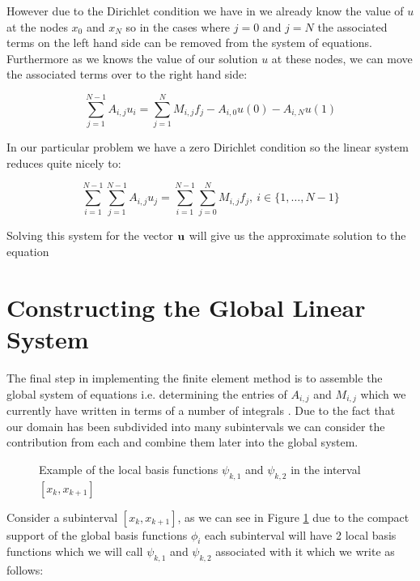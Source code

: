 However due to the Dirichlet condition we have in 
we already know the value of $u$ at the nodes $x_0$ and $x_N$ so in the cases
where $j = 0$ and $j = N$ the associated terms on the left hand side can be
removed from the system of equations. Furthermore as we knows the value of our
solution $u$ at these nodes, we can move the associated terms over to the right
hand side:

\begin{equation}
    \sum_{j=1}^{N-1}A_{i,j}u_i =
        \sum_{j=1}^{N}M_{i,j}f_j - A_{i,0}u(0) - A_{i,N}u(1)
\end{equation}

In our particular problem we have a zero Dirichlet condition so the linear
system reduces quite nicely to:

\begin{equation}\label{eq:oned-deterministic-fem}
    \sum_{i=1}^{N-1}\sum_{j=1}^{N-1}A_{i,j}u_j
        = \sum_{i=1}^{N-1}\sum_{j=0}^NM_{i,j}f_j,\ i \in \{1,\dots,N-1\}
\end{equation}

Solving this system for the vector $\mathbf{u}$ will give us the approximate
solution to the equation 

\section{Constructing the Global Linear System}\label{sec:oned-deterministic-global-construct}

The final step in implementing the finite element method is to assemble the
global system of equations i.e.  determining the entries of $A_{i,j}$ and
$M_{i,j}$ which we currently have written in terms of a number of integrals
. Due to the fact that our domain has
been subdivided into many subintervals we can consider the contribution from
each and combine them later into the global system.

\begin{figure}
\centering

\caption{Example of the local basis functions $\psi_{k,1}$ and $\psi_{k,2}$
         in the interval $[x_k, x_{k + 1}]$}
\label{fig:oned-local-basis}
\end{figure}

Consider a subinterval $[x_k, x_{k+1}]$, as we can see in Figure
\ref{fig:oned-local-basis} due to the compact support of the global basis
functions $\phi_i$ each subinterval will have 2 local basis functions which we
will call $\psi_{k,1}$ and $\psi_{k,2}$ associated with it which we write as
follows:

